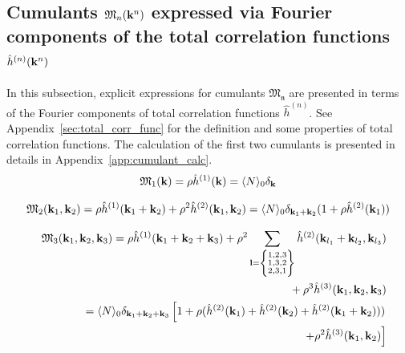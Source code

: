 \subsection{\label{sec:cumulants_via_h} Cumulants $\mathfrak M_n(\vb k^n)$ expressed via Fourier components of the total correlation functions $\hat{h}^{(n)}(\vb k^n)$}
In this subsection, explicit expressions for cumulants $\mathfrak{M_n}$ are presented in terms of the Fourier components of total correlation functions $\hat{h}^{(n)}$. See Appendix~\ref{sec:total_corr_func} for the definition and some properties of total correlation functions. The calculation of the first two cumulants is presented in details in Appendix~\ref{app:cumulant_calc}.
\begin{equation}
	\label{CumulantM1}
	\mathfrak M_1(\vb k) = \rho \hat{h}^{(1)}(\vb k) = \langle N \rangle_0 \delta_{\vb k}
\end{equation}

\begin{equation}
	\label{CumulantM2}
	\mathfrak M_2(\vb k_1, \vb k_2) = \rho \hat{h}^{(1)}(\vb k_1 + \vb k_2) + \rho^2\hat{h}^{(2)}(\vb k_1, \vb k_2) = \langle N \rangle_0 \delta_{\vb k_1 + \vb k_2} (1 + \rho \hat{h}^{(2)}(\vb k_1))
\end{equation}

\begin{eqnarray}
	\label{CumulantM3}
	&&\mathfrak M_3 (\vb k_1, \vb k_2, \vb k_3)
	= \rho \hat{h}^{(1)}(\vb k_1 + \vb k_2 + \vb k_3) + 
	\rho^2 \sum_{{\vb l}=\left\{ \substack{1,2,3 \\ 1,3,2 \\ 2,3,1}
		\right\}}
	\hat{h}^{(2)}(\vb k_{l_1} + \vb k_{l_2}, \vb k_{l_3}) 
	\nonumber\\
	&&\quad{} + \rho^3 \hat{h}^{(3)}(\vb k_1, \vb k_2, \vb k_3)
	\nonumber \\
	&& = \langle N \rangle_0 \delta_{\vb k_1 + \vb k_2 + \vb k_3} 
	\left[ 1 + \rho(\hat{h}^{(2)}(\vb k_1) + \hat{h}^{(2)}(\vb k_2) + \hat{h}^{(2)}(\vb k_1 + \vb k_2)) )\right. 
	\nonumber\\
	&& \quad{} \left. + \rho^2 \hat{h}^{(3)}(\vb k_1, \vb k_2) \right]
\end{eqnarray}

